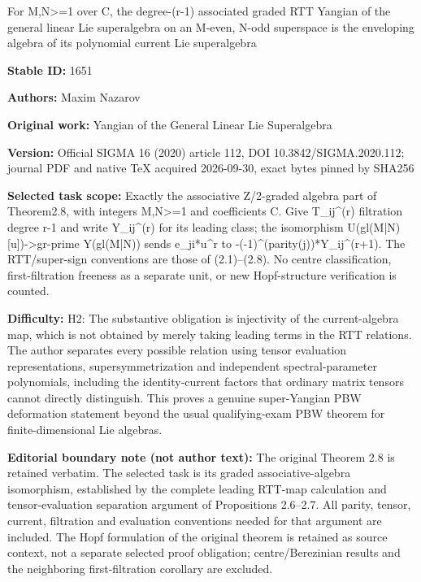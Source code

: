 \documentclass[11pt]{article}
\numberwithin{equation}{section}
\begin{document}
\begin{center}\Large For M,N>=1 over C, the degree-(r-1) associated graded RTT Yangian of the general linear Lie superalgebra on an M-even, N-odd superspace is the enveloping algebra of its polynomial current Lie superalgebra\end{center}
\noindent\textbf{Stable ID:} 1651\par
\noindent\textbf{Authors:} Maxim Nazarov\par
\noindent\textbf{Original work:} Yangian of the General Linear Lie Superalgebra\par
\noindent\textbf{Version:} Official SIGMA 16 (2020) article 112, DOI 10.3842/SIGMA.2020.112; journal PDF and native TeX acquired 2026-09-30, exact bytes pinned by SHA256\par
\noindent\textbf{Selected task scope:} Exactly the associative Z/2-graded algebra part of Theorem2.8, with integers M,N>=1 and coefficients C. Give T\_ij\textasciicircum{}(r) filtration degree r-1 and write Y\_ij\textasciicircum{}(r) for its leading class; the isomorphism U(gl(M|N)[u])->gr-prime Y(gl(M|N)) sends e\_ji*u\textasciicircum{}r to -(-1)\textasciicircum{}(parity(j))*Y\_ij\textasciicircum{}(r+1). The RTT/super-sign conventions are those of (2.1)–(2.8). No centre classification, first-filtration freeness as a separate unit, or new Hopf-structure verification is counted.\par
\noindent\textbf{Difficulty:} H2: The substantive obligation is injectivity of the current-algebra map, which is not obtained by merely taking leading terms in the RTT relations. The author separates every possible relation using tensor evaluation representations, supersymmetrization and independent spectral-parameter polynomials, including the identity-current factors that ordinary matrix tensors cannot directly distinguish. This proves a genuine super-Yangian PBW deformation statement beyond the usual qualifying-exam PBW theorem for finite-dimensional Lie algebras.\par
\noindent\textbf{Editorial boundary note (not author text):} The original Theorem 2.8 is retained verbatim. The selected task is its graded associative-algebra isomorphism, established by the complete leading RTT-map calculation and tensor-evaluation separation argument of Propositions 2.6–2.7. All parity, tensor, current, filtration and evaluation conventions needed for that argument are included. The Hopf formulation of the original theorem is retained as source context, not a separate selected proof obligation; centre/Berezinian results and the neighboring first-filtration corollary are excluded.\par
\end{document}
